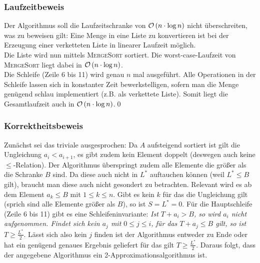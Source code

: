 \documentclass[a4paper]{article}
\begin{document}
		\subsubsection*{Laufzeitbeweis}
		Der Algorithmus soll die Laufzeitschranke von $\mathcal{O}\left(n\cdot\log{n}\right)$ nicht überschreiten, was zu beweisen gilt:\n
		Eine Menge in eine Liste zu konvertieren ist bei der Erzeugung einer verketteten Liste in linearer Laufzeit möglich.\\
		Die Liste wird nun mittels \textsc{MergeSort} sortiert. Die worst-case-Laufzeit von \textsc{MergeSort} liegt dabei in $\mathcal{O}\left(n\cdot\log{n}\right)$.\\
		Die Schleife (Zeile 6 bis 11) wird genau $n$ mal ausgeführt. Alle Operationen in der Schleife lassen sich in konstanter Zeit bewerkstelligen, sofern man die Menge genügend schlau implementiert (z.B. als verkettete Liste).\n
		Somit liegt die Gesamtlaufzeit auch in $\mathcal{O}\left(n\cdot\log{n}\right)$.\qed
		\subsubsection*{Korrektheitsbeweis}
		Zunächst sei das triviale ausgesprochen: Da $A$ aufsteigend sortiert ist gilt die Ungleichung $a_i<a_{i+1}$, es gibt zudem kein Element doppelt (deswegen auch keine $\leq$-Relation).\n
		Der Algorithmus überspringt zudem alle Elemente die größer als die Schranke $B$ sind. Da diese auch nicht in $L^*$ auftauchen können (weil $L^*\leq B$ gilt), braucht man diese auch nicht gesondert zu betrachten. Relevant wird es ab dem Element $a_k\leq B$ mit $1\leq k\leq n$. Gibt es kein $k$ für das die Ungleichung gilt (sprich sind alle Elemente größer als $B$), so ist $S=L^*=0$.\n
		Für die Hauptschleife (Zeile 6 bis 11) gibt es eine Schleifeninvariante: \textit{Ist $T+a_i>B$, so wird $a_i$ nicht aufgenommen. Findet sich kein $a_j$ mit $0\leq j\leq i$, für das $T+a_j\leq B$ gilt, so ist $T\geq \frac{L^*}{2}$}. Lässt sich also kein $j$ finden ist der Algorithmus entweder zu Ende oder hat ein genügend genaues Ergebnis geliefert für das gilt $T\geq \frac{L^*}{2}$. Daraus folgt, dass der angegebene Algorithmus ein 2-Approximationsalgorithmus ist.
\end{document}
